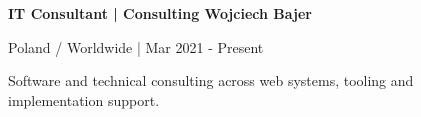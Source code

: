 \textbf{IT Consultant | Consulting Wojciech Bajer}\par
Poland / Worldwide | Mar 2021 - Present\par
Software and technical consulting across web systems, tooling and implementation support.
